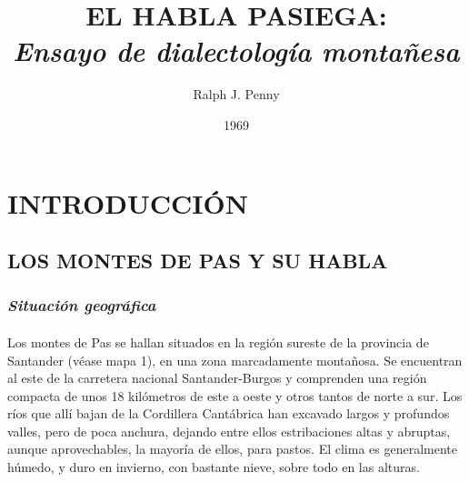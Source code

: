 \documentclass[11pt,spanish,b5paper]{book}
\begin{document}
\author{Ralph J. Penny}
\title{EL HABLA PASIEGA: \\ \emph{Ensayo de dialectología montañesa}}
\date{1969}
\maketitle

\titlespacing*{\chapter}{0pt}{0pt}{0pt}

\setcounter{tocdepth}{1}

\renewcommand \thechapter{\roman{chapter}}
\renewcommand \thesection{\Alph{section}}
\renewcommand \thesubsection{§ \arabic{subsection}}

\part*{INTRODUCCIÓN}


\chapter{LOS MONTES DE PAS Y SU HABLA}
\section{\emph{Situación geográfica}}
\subsection{} Los montes de Pas se hallan situados en la región sureste de la provincia de Santander (véase mapa 1), en una zona marcadamente montañosa. Se encuentran al este de la carretera nacional Santander-Burgos y comprenden una región compacta de unos 18 kilómetros de este a oeste y  otros tantos de norte a sur. Los ríos que allí bajan de la Cordillera Cantábrica han excavado largos y profundos valles, pero de poca anchura, dejando entre ellos estribaciones altas y abruptas, aunque aprovechables, la mayoría de ellos, para pastos. El clima es generalmente húmedo, y duro en invierno, con bastante nieve, sobre todo en las alturas. 
\end{document}

